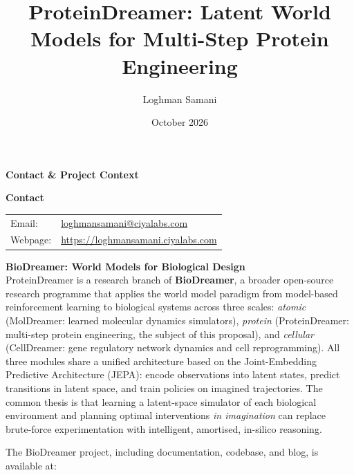 \documentclass[12pt, a4paper]{article}
\title{
    \textbf{ProteinDreamer: Latent World Models for Multi-Step Protein Engineering}\\[0.8em]

}
\author{Loghman Samani}
\date{October 2026}
\begin{document}
\maketitle
\thispagestyle{empty}
\newpage

\thispagestyle{empty}
\vspace*{2cm}

\begin{center}
{\Large \textbf{Contact \& Project Context}}
\end{center}

\vspace{1.5cm}

\noindent\textbf{Contact}\\[0.4em]
\begin{tabular}{@{}ll}
Email: & \href{mailto:loghmansamani@ciyalabs.com}{loghmansamani@ciyalabs.com} \\
Webpage: & \url{https://loghmansamani.ciyalabs.com} \\
\end{tabular}

\vspace{1.5cm}

\noindent\textbf{BioDreamer: World Models for Biological Design}\\[0.4em]
\noindent ProteinDreamer is a research branch of \textbf{BioDreamer}, a broader open-source research programme that applies the world model paradigm from model-based reinforcement learning to biological systems across three scales: \textit{atomic} (MolDreamer: learned molecular dynamics simulators), \textit{protein} (ProteinDreamer: multi-step protein engineering, the subject of this proposal), and \textit{cellular} (CellDreamer: gene regulatory network dynamics and cell reprogramming). All three modules share a unified architecture based on the Joint-Embedding Predictive Architecture (JEPA): encode observations into latent states, predict transitions in latent space, and train policies on imagined trajectories. The common thesis is that learning a latent-space simulator of each biological environment and planning optimal interventions \textit{in imagination} can replace brute-force experimentation with intelligent, amortised, in-silico reasoning.

\vspace{0.8em}
\noindent The BioDreamer project, including documentation, codebase, and blog, is available at:
\end{document}
